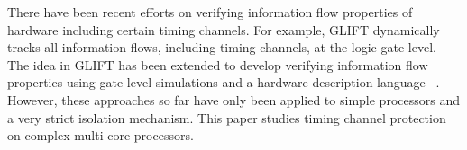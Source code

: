 There have been recent efforts on verifying information flow properties
of hardware including certain timing channels. For example, GLIFT
\cite{glift-asplos09} dynamically tracks all information flows, including timing channels,
at the logic gate level. 
The idea in GLIFT has been extended to develop verifying
information flow properties using gate-level simulations
\cite{glift-dac10,glift-dac11,glift-isca11} and a 
hardware description language
~\cite{caisson-plas10,caisson-pldi11,sapper-plas13}.
However, these approaches so far have only been applied to simple
processors and a very strict isolation mechanism. 
This paper studies timing channel protection on complex multi-core processors.

